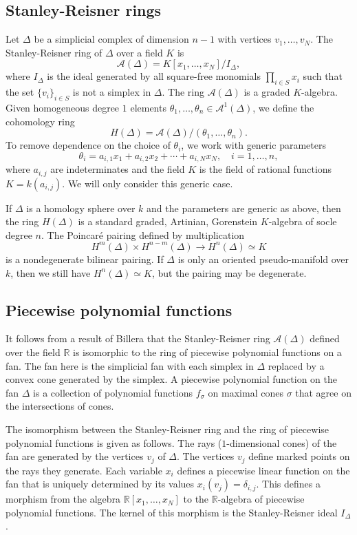 \documentclass[10pt]{article}
\theoremstyle{definition}
\newcommand{\RR}{{\mathbb{R}}}
\newcommand{\cA}{{\mathcal A}}
\newcommand{\isom}{\simeq}
\newcommand{\Po}{Poincar\'e }
\renewcommand{\a}[1]{a_{#1}}
\begin{document}
\subsection{Stanley-Reisner rings}

Let $\Delta$ be a simplicial complex of dimension $n-1$  with vertices $v_1, \ldots, v_N$. The Stanley-Reisner ring of  $\Delta$ over a field $K$ is
\[ \cA(\Delta) = K[x_1,\ldots, x_N]/I_\Delta,\]
where $I_\Delta$ is the ideal generated by all square-free monomials $\prod_{i\in S} x_i$ such that the set $\{ v_i \}_{i\in S}$ is not a simplex in $\Delta$. The ring $\cA(\Delta)$ is a graded $K$-algebra. Given homogeneous degree $1$ elements $\theta_1,\ldots, \theta_n \in \cA^1(\Delta)$, we define the cohomology ring
\[ H(\Delta) = \cA(\Delta)/(\theta_1,\ldots,\theta_n).\]
To remove dependence on the choice of $\theta_i$, we work with generic parameters
\[ \theta_i = \a{i, 1} x_1 + \a{i, 2} x_2 + \cdots + \a{i, N} x_N, \quad i=1,\ldots,n,\]
where $\a{i, j}$ are indeterminates and the field $K$ is the field of rational functions $K=k(\a{i, j})$. We will only consider this generic case. 

If $\Delta$ is a homology sphere over $k$ and the parameters are generic as above, then the ring $H(\Delta)$ is a standard graded, Artinian, Gorenstein $K$-algebra of socle degree $n$. The \Po pairing defined by multiplication 
\[ H^m(\Delta) \times H^{n-m}(\Delta) \longrightarrow H^n(\Delta) \isom K\]
is a nondegenerate  bilinear pairing. If $\Delta$ is only an oriented pseudo-manifold over $k$, then we still have $H^n(\Delta) \isom K$, but the pairing may be degenerate.


\subsection{Piecewise polynomial functions}

It follows from a result of Billera \cite[Theorem 3.6]{Billera} that the Stanley-Reisner ring $\cA(\Delta)$ defined over the field $\RR$ is isomorphic to the ring of piecewise polynomial functions on a fan.  The fan here is the simplicial fan with each simplex in $\Delta$ replaced by a convex cone generated by the simplex. A piecewise polynomial function on the fan  $\Delta$ is a collection of polynomial functions $f_\sigma$ on maximal cones $\sigma$ that agree on the intersections of cones. 

The isomorphism between the Stanley-Reisner ring and the ring of piecewise polynomial functions is given as follows.  The rays ($1$-dimensional cones) of the fan are generated by the vertices $v_j$ of $\Delta$. The vertices $v_j$ define marked points on the rays they generate. Each variable $x_i$ defines a piecewise linear function on the fan that is uniquely determined by its values $x_i(v_j) = \delta_{i,j}$. This defines a morphism from the algebra $\RR[x_1,\ldots, x_N]$ to the $\RR$-algebra of piecewise polynomial functions. The kernel of this morphism is the Stanley-Reisner ideal $I_\Delta$. 
\end{document}
